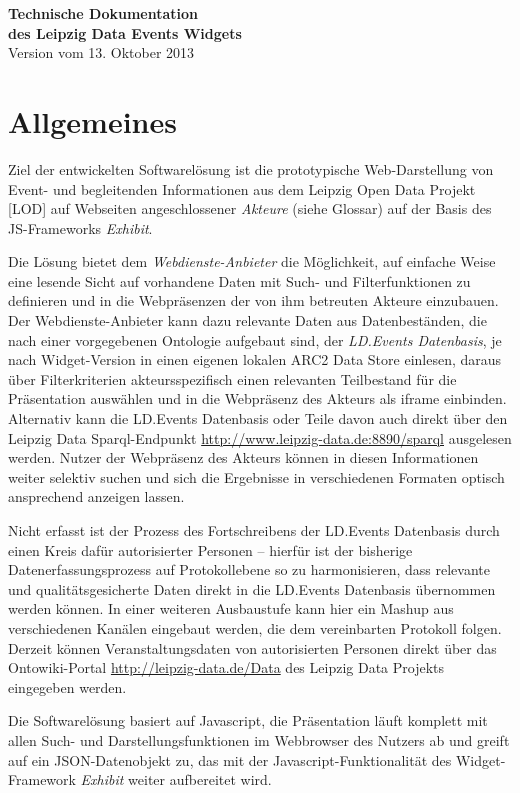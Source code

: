 \documentclass[11pt,a4paper]{article}
\begin{document}
\begin{center}
  \textbf{\Large Technische Dokumentation\\[.3em] des Leipzig Data Events
    Widgets}\\[1em] Version vom 13. Oktober 2013
\end{center}

\section{Allgemeines}
Ziel der entwickelten Softwarelösung ist die prototypische Web-Darstellung von
Event- und begleitenden Informationen aus dem Leipzig Open Data Projekt [LOD]
auf Webseiten angeschlossener \emph{Akteure} (siehe Glossar) auf der Basis des
JS-Frameworks \emph{Exhibit}.

Die Lösung bietet dem \emph{Webdienste-Anbieter} die Möglichkeit, auf einfache
Weise eine lesende Sicht auf vorhandene Daten mit Such- und Filterfunktionen
zu definieren und in die Webpräsenzen der von ihm betreuten Akteure
einzubauen.  Der Webdienste-Anbieter kann dazu relevante Daten aus
Datenbeständen, die nach einer vorgegebenen Ontologie aufgebaut sind, der
\emph{LD.Events Datenbasis}, je nach Widget-Version in einen eigenen lokalen
ARC2 Data Store einlesen, daraus über Filterkriterien akteursspezifisch einen
relevanten Teilbestand für die Präsentation auswählen und in die Webpräsenz
des Akteurs als iframe einbinden. Alternativ kann die LD.Events Datenbasis
oder Teile davon auch direkt über den Leipzig Data Sparql-Endpunkt
\url{http://www.leipzig-data.de:8890/sparql} ausgelesen werden. Nutzer der
Webpräsenz des Akteurs können in diesen Informationen weiter selektiv suchen
und sich die Ergebnisse in verschiedenen Formaten optisch ansprechend anzeigen
lassen.

Nicht erfasst ist der Prozess des Fortschreibens der LD.Events Datenbasis
durch einen Kreis dafür autorisierter Personen -- hierfür ist der bisherige
Datenerfassungsprozess auf Protokollebene so zu harmonisieren, dass relevante
und qualitätsgesicherte Daten direkt in die LD.Events Datenbasis übernommen
werden können. In einer weiteren Ausbaustufe kann hier ein Mashup aus
verschiedenen Kanälen eingebaut werden, die dem vereinbarten Protokoll folgen.
Derzeit können Veranstaltungsdaten von autorisierten Personen direkt über das
Ontowiki-Portal \url{http://leipzig-data.de/Data} des Leipzig Data Projekts
eingegeben werden.

Die Softwarelösung basiert auf Javascript, die Präsentation läuft komplett mit
allen Such- und Darstellungsfunktionen im Webbrowser des Nutzers ab und greift
auf ein JSON-Datenobjekt zu, das mit der Javascript-Funktionalität des
Widget-Framework \emph{Exhibit} weiter aufbereitet wird.
\end{document}
